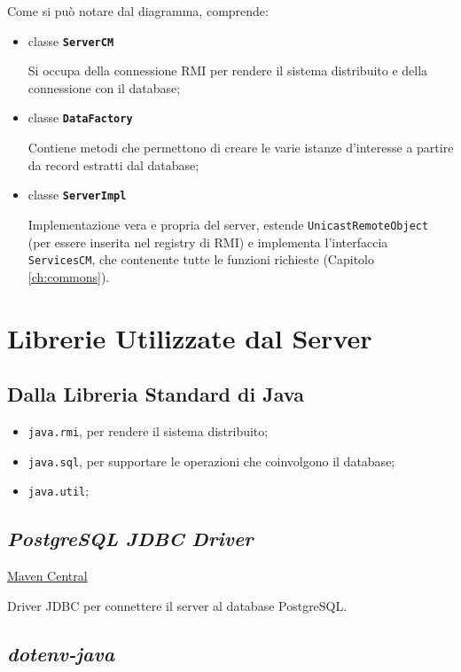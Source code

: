 Come si può notare dal diagramma, comprende:
\begin{itemize}
	\item classe \textbf{\texttt{ServerCM}}
		
		Si occupa della connessione RMI per rendere il sistema distribuito e della connessione con il database;
	\item classe \textbf{\texttt{DataFactory}}
		
		Contiene metodi che permettono di creare le varie istanze d'interesse a partire da record estratti dal database;
	\item classe \textbf{\texttt{ServerImpl}}
		
		Implementazione vera e propria del server, estende \texttt{UnicastRemoteObject} (per essere inserita nel registry di RMI) e implementa l'interfaccia \texttt{ServicesCM}, che contenente tutte le funzioni richieste (Capitolo \ref{ch:commons}).
\end{itemize}

\section{Librerie Utilizzate dal Server}

\subsection{Dalla Libreria Standard di Java}

\begin{itemize}
	\item \texttt{java.rmi}, per rendere il sistema distribuito;
	\item \texttt{java.sql}, per supportare le operazioni che coinvolgono il database;
	\item \texttt{java.util};
\end{itemize}


\subsection{\textsl{PostgreSQL JDBC Driver}}

\href{https://mvnrepository.com/artifact/org.postgresql/postgresql/42.7.3}{Maven Central}

Driver JDBC per connettere il server al database PostgreSQL.

\subsection{\textsl{dotenv-java}}

